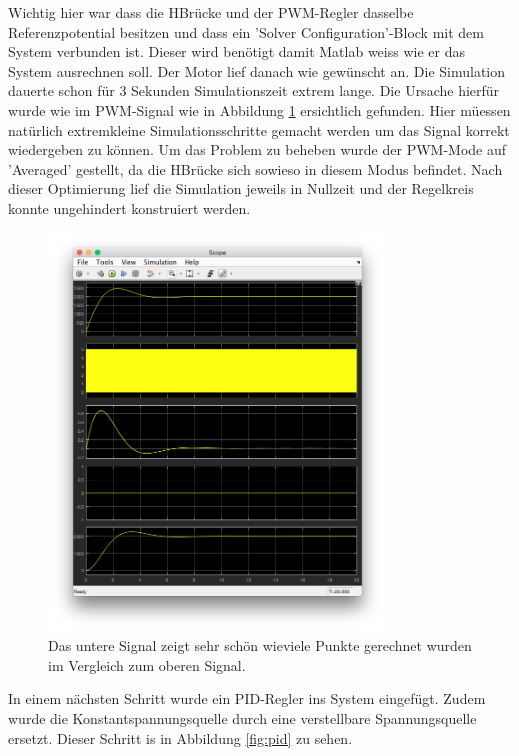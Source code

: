 \documentclass{fhnwreport} %
\begin{document}
Wichtig hier war dass die HBrücke und der PWM-Regler dasselbe Referenzpotential besitzen und dass ein 'Solver Configuration'-Block mit dem System verbunden ist. Dieser wird benötigt damit Matlab weiss wie er das System ausrechnen soll. Der Motor lief danach wie gewünscht an. Die Simulation dauerte schon für 3 Sekunden Simulationszeit extrem lange. Die Ursache hierfür wurde wie im PWM-Signal wie in Abbildung \ref{fig:pwm} ersichtlich gefunden. Hier müessen natürlich extremkleine Simulationsschritte gemacht werden um das Signal korrekt wiedergeben zu können.
Um das Problem zu beheben wurde der PWM-Mode auf 'Averaged' gestellt, da die HBrücke sich sowieso in diesem Modus befindet.
Nach dieser Optimierung lief die Simulation jeweils in Nullzeit und der Regelkreis konnte ungehindert konstruiert werden.

\begin{figure}
\begin{center}
\includegraphics[trim={2cm 18cm 2cm 3.6cm},clip,width=0.8\textwidth]{pwm}
\caption{Das untere Signal zeigt sehr schön wieviele Punkte gerechnet wurden im Vergleich zum oberen Signal.}
\label{fig:pwm}
\end{center}
\end{figure}

In einem nächsten Schritt wurde ein PID-Regler ins System eingefügt. Zudem wurde die Konstantspannungsquelle durch eine verstellbare Spannungsquelle ersetzt.
Dieser Schritt is in Abbildung \ref{fig:pid} zu sehen.
\end{document}
